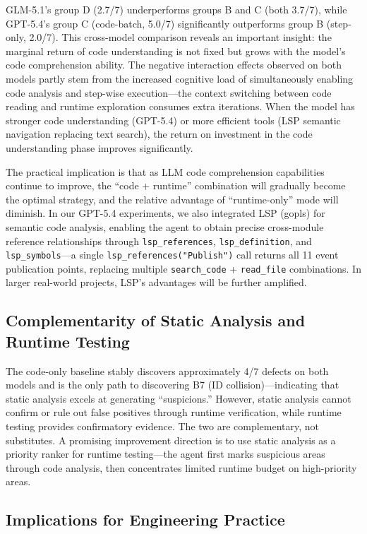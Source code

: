 \documentclass[sigconf,nonacm]{acmart}
\begin{document}
GLM-5.1's group D (2.7/7) underperforms groups B and C (both 3.7/7), while GPT-5.4's group C (code-batch, 5.0/7) significantly outperforms group B (step-only, 2.0/7). This cross-model comparison reveals an important insight: the marginal return of code understanding is not fixed but grows with the model's code comprehension ability. The negative interaction effects observed on both models partly stem from the increased cognitive load of simultaneously enabling code analysis and step-wise execution---the context switching between code reading and runtime exploration consumes extra iterations. When the model has stronger code understanding (GPT-5.4) or more efficient tools (LSP semantic navigation replacing text search), the return on investment in the code understanding phase improves significantly.

The practical implication is that as LLM code comprehension capabilities continue to improve, the ``code + runtime'' combination will gradually become the optimal strategy, and the relative advantage of ``runtime-only'' mode will diminish. In our GPT-5.4 experiments, we also integrated LSP (gopls) for semantic code analysis, enabling the agent to obtain precise cross-module reference relationships through \texttt{lsp\_references}, \texttt{lsp\_definition}, and \texttt{lsp\_symbols}---a single \texttt{lsp\_references("Publish")} call returns all 11 event publication points, replacing multiple \texttt{search\_code} + \texttt{read\_file} combinations. In larger real-world projects, LSP's advantages will be further amplified.

\subsection{Complementarity of Static Analysis and Runtime Testing}

The code-only baseline stably discovers approximately 4/7 defects on both models and is the only path to discovering B7 (ID collision)---indicating that static analysis excels at generating ``suspicions.'' However, static analysis cannot confirm or rule out false positives through runtime verification, while runtime testing provides confirmatory evidence. The two are complementary, not substitutes. A promising improvement direction is to use static analysis as a priority ranker for runtime testing---the agent first marks suspicious areas through code analysis, then concentrates limited runtime budget on high-priority areas.

\subsection{Implications for Engineering Practice}
\end{document}
